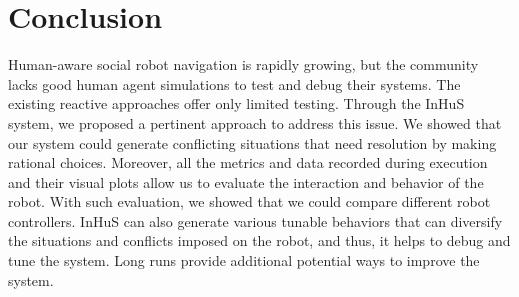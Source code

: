 \section{Conclusion}

Human-aware social robot navigation is rapidly growing, but the community lacks good human agent simulations to test and debug their systems. The existing reactive approaches offer only limited testing. Through the InHuS system, we proposed a pertinent approach to address this issue. We showed that our system could generate conflicting situations that need resolution by making rational choices. Moreover, all the metrics and data recorded during execution and their visual plots allow us to evaluate the interaction and behavior of the robot. With such evaluation, we showed that we could compare different robot controllers. InHuS can also generate various tunable behaviors that can diversify the situations and conflicts imposed on the robot, and thus, it helps to debug and tune the system. Long runs provide additional potential ways to improve the system.  